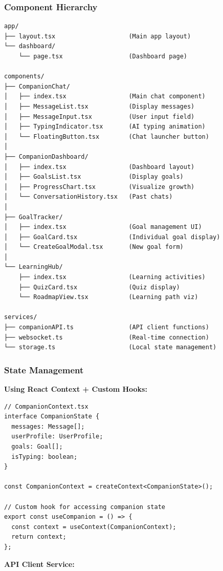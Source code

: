\documentclass[12pt,a4paper]{article}
\begin{document}
\subsubsection{Component Hierarchy}

\begin{verbatim}
app/
├── layout.tsx                    (Main app layout)
└── dashboard/
    └── page.tsx                  (Dashboard page)

components/
├── CompanionChat/
│   ├── index.tsx                 (Main chat component)
│   ├── MessageList.tsx           (Display messages)
│   ├── MessageInput.tsx          (User input field)
│   ├── TypingIndicator.tsx       (AI typing animation)
│   └── FloatingButton.tsx        (Chat launcher button)
│
├── CompanionDashboard/
│   ├── index.tsx                 (Dashboard layout)
│   ├── GoalsList.tsx             (Display goals)
│   ├── ProgressChart.tsx         (Visualize growth)
│   └── ConversationHistory.tsx   (Past chats)
│
├── GoalTracker/
│   ├── index.tsx                 (Goal management UI)
│   ├── GoalCard.tsx              (Individual goal display)
│   └── CreateGoalModal.tsx       (New goal form)
│
└── LearningHub/
    ├── index.tsx                 (Learning activities)
    ├── QuizCard.tsx              (Quiz display)
    └── RoadmapView.tsx           (Learning path viz)

services/
├── companionAPI.ts               (API client functions)
├── websocket.ts                  (Real-time connection)
└── storage.ts                    (Local state management)
\end{verbatim}

\subsubsection{State Management}

\textbf{Using React Context + Custom Hooks:}

\begin{verbatim}
// CompanionContext.tsx
interface CompanionState {
  messages: Message[];
  userProfile: UserProfile;
  goals: Goal[];
  isTyping: boolean;
}

const CompanionContext = createContext<CompanionState>();

// Custom hook for accessing companion state
export const useCompanion = () => {
  const context = useContext(CompanionContext);
  return context;
};
\end{verbatim}

\textbf{API Client Service:}
\end{document}
